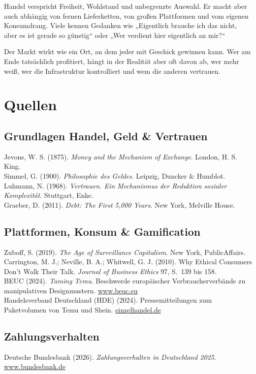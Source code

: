 \documentclass[11pt, a4paper]{article}
\begin{document}
Handel verspricht Freiheit, Wohlstand und unbegrenzte Auswahl. Er macht aber auch abhängig von fernen Lieferketten, von großen
Plattformen und vom eigenen Konsumdrang. Viele kennen Gedanken wie „Eigentlich brauche ich das nicht, aber es ist gerade so günstig“
oder „Wer verdient hier eigentlich an mir?“

Der Markt wirkt wie ein Ort, an dem jeder mit Geschick gewinnen kann. Wer am Ende tatsächlich profitiert, hängt in der Realität aber oft
davon ab, wer mehr weiß, wer die Infrastruktur kontrolliert und wem die anderen vertrauen.

\newpage
\section*{Quellen}

\subsection*{Grundlagen Handel, Geld \& Vertrauen}
Jevons, W. S. (1875). \emph{Money and the Mechanism of Exchange}. London, H. S. King.\\
Simmel, G. (1900). \emph{Philosophie des Geldes}. Leipzig, Duncker \& Humblot.\\
Luhmann, N. (1968). \emph{Vertrauen. Ein Mechanismus der Reduktion sozialer Komplexität}. Stuttgart, Enke.\\
Graeber, D. (2011). \emph{Debt: The First 5,000 Years}. New York, Melville House.

\subsection*{Plattformen, Konsum \& Gamification}
Zuboff, S. (2019). \emph{The Age of Surveillance Capitalism}. New York, PublicAffairs.\\
Carrington, M. J.; Neville, B. A.; Whitwell, G. J. (2010). Why Ethical Consumers Don't Walk Their Talk. \emph{Journal of Business Ethics} 97, S.~139 bis 158.\\
BEUC (2024). \emph{Taming Temu}. Beschwerde europäischer Verbraucherverbände zu manipulativen Designmustern. \href{https://www.beuc.eu}{www.beuc.eu}\\
Handelsverband Deutschland (HDE) (2024). Pressemitteilungen zum Paketvolumen von Temu und Shein. \href{https://einzelhandel.de}{einzelhandel.de}

\subsection*{Zahlungsverhalten}
Deutsche Bundesbank (2026). \emph{Zahlungsverhalten in Deutschland 2025}. \href{https://www.bundesbank.de}{www.bundesbank.de}
\end{document}
